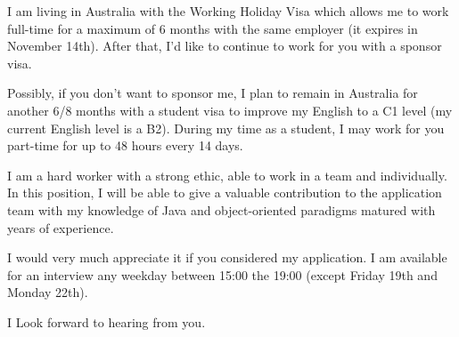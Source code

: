 \documentclass[11pt, a4paper]{awesome-cv}
\begin{document}
\begin{cvletter}
I am living in Australia with the Working Holiday Visa which allows me to work full-time for a maximum of 6 months with the same employer (it expires in November 14th). After that, I’d like to continue to work for you with a sponsor visa.

Possibly, if you don't want to sponsor me, I plan to remain in Australia for another 6/8 months with a student visa to improve my English to a C1 level (my current English level is a B2). During my time as a student, I may work for you part-time for up to 48 hours every 14 days.


I am a hard worker with a strong ethic, able to work in a team and individually. In this position, I will be able to give a valuable contribution to the application team with my knowledge of Java and object-oriented paradigms matured with years of experience.

I would very much appreciate it if you considered my application. I am available for an interview any weekday between 15:00 the 19:00 (except Friday 19th and Monday 22th).

I Look forward to hearing from you.

\end{cvletter}


\makeletterclosing
\end{document}
